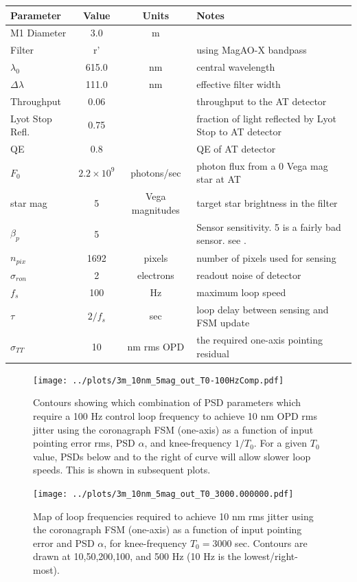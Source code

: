 \documentclass[10pt,preprint]{aastex631}
\begin{document}
\begin{table}[h!]
\begin{tabular}{lccl}
\hline
\hline
Parameter & Value & Units & Notes \\
\hline
M1 Diameter & 3.0 & m &\\
Filter      & r'  &   & using MagAO-X bandpass \\
$\lambda_0$  & 615.0 & nm & central wavelength \\
$\Delta \lambda$ &  111.0 & nm & effective filter width \\
Throughput  & 0.06 && throughput to the AT detector \\
Lyot Stop Refl. & 0.75 & & fraction of light reflected by Lyot Stop to AT detector \\
QE & 0.8 && QE of AT detector \\
$F_0$ & $2.2\times10^{9}$ & photons/sec & photon flux from a 0 Vega mag star at AT \\
star mag & 5 & Vega magnitudes & target star brightness in the filter \\
$\beta_p$ & 5 & & Sensor sensitivity. 5 is a fairly bad sensor. see \citep{2005ApJ...629..592G}. \\
$n_{pix}$ & 1692 & pixels & number of pixels used for sensing \\
$\sigma_{ron}$ & 2 & electrons & readout noise of detector\\
$f_s$ & 100 & Hz & maximum loop speed \\
$\tau$ & $2/f_s$ & sec & loop delay between sensing and FSM update \\
$\sigma_{TT}$ & 10 & nm rms OPD & the required one-axis pointing residual\\
\hline
\end{tabular}
\end{table}

\begin{figure}[h!]
\centering
\texttt{[image: ../plots/3m\_10nm\_5mag\_out\_T0-100HzComp.pdf]}
\caption{Contours showing which combination of PSD parameters which require a 100 Hz control loop frequency to achieve 10 nm OPD rms jitter using the coronagraph FSM (one-axis) as a function of input pointing error rms, PSD $\alpha$, and knee-frequency $1/T_0$. For a given $T_0$ value, PSDs below and to the right of curve will allow slower loop speeds.  This is shown in subsequent plots.  \label{fig:s2_T0-100HzComp}}
\end{figure}

\begin{figure}[h!]
\centering
\texttt{[image: ../plots/3m\_10nm\_5mag\_out\_T0\_3000.000000.pdf]}
\caption{Map of loop frequencies required to achieve 10 nm rms jitter using the coronagraph FSM (one-axis) as a function of input pointing error and PSD $\alpha$, for knee-frequency $T_0 = 3000$ sec.  Contours are drawn at 10,50,200,100, and 500 Hz (10 Hz is the lowest/right-most).  \label{fig:s2_T0-3000}}
\end{figure}
\end{document}
